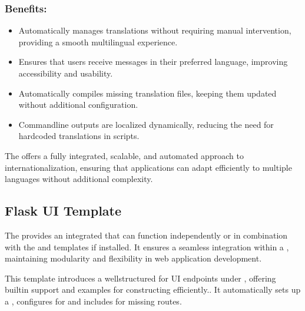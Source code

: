 \documentclass[letterpaper,10pt,english]{sphinxhowto}
\begin{document}
\subsubsection{Benefits:}
\label{\detokenize{templates/locales/index:benefits}}\begin{itemize}
\item {} 
\sphinxAtStartPar
{}
Automatically manages translations without requiring manual intervention, providing a smooth multilingual experience.

\item {} 
\sphinxAtStartPar
{}
Ensures that users receive messages in their preferred language, improving accessibility and usability.

\item {} 
\sphinxAtStartPar
{}
Automatically compiles missing translation files, keeping them updated without additional configuration.

\item {} 
\sphinxAtStartPar
{}
Command\sphinxhyphen{}line outputs are localized dynamically, reducing the need for hardcoded translations in scripts.

\end{itemize}

\sphinxAtStartPar
The  offers a fully integrated, scalable, and automated approach to internationalization, ensuring that applications can adapt efficiently to multiple languages without additional complexity.

\sphinxstepscope


\subsection{Flask UI Template}
\label{\detokenize{templates/flask_ui/index:flask-ui-template}}\label{\detokenize{templates/flask_ui/index::doc}}
\sphinxAtStartPar
The  provides an integrated  that can function independently or in combination with the  and  templates if installed. It ensures a seamless integration within a , maintaining modularity and flexibility in web application development.

\sphinxAtStartPar
This template introduces a well\sphinxhyphen{}structured  for UI endpoints under , offering built\sphinxhyphen{}in support and examples for constructing  efficiently.. It automatically sets up a , configures  for  and includes  for missing routes.
\end{document}
